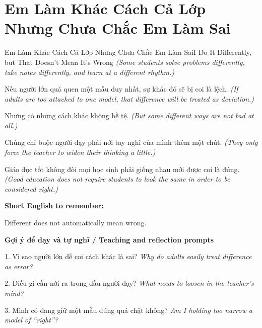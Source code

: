 \section{Em Làm Khác Cách Cả Lớp Nhưng Chưa Chắc Em Làm Sai}
\begin{truyen}{Em Làm Khác Cách Cả Lớp Nhưng Chưa Chắc Em Làm Sai}{I Do It Differently, but That Doesn't Mean It's Wrong}
\textit{(Some students solve problems differently, take notes differently, and learn at a different rhythm.)}

Nếu người lớn quá quen một mẫu duy nhất, sự khác đó sẽ bị coi là lệch.
\textit{(If adults are too attached to one model, that difference will be treated as deviation.)}

Nhưng có những cách khác không hề tệ.
\textit{(But some different ways are not bad at all.)}

Chúng chỉ buộc người dạy phải nới tay nghĩ của mình thêm một chút.
\textit{(They only force the teacher to widen their thinking a little.)}

\end{truyen}

\begin{baihoc}
Giáo dục tốt không đòi mọi học sinh phải giống nhau mới được coi là đúng.
\textit{(Good education does not require students to look the same in order to be considered right.)}
\end{baihoc}

\begin{ghinhoanh}
\textbf{Short English to remember:}

Different does not automatically mean wrong.

\end{ghinhoanh}

\begin{tuhocnhanh}
\textbf{Gợi ý để dạy và tự nghĩ / Teaching and reflection prompts}

1. Vì sao người lớn dễ coi cách khác là sai? \textit{Why do adults easily treat difference as error?}

2. Điều gì cần nới ra trong đầu người dạy? \textit{What needs to loosen in the teacher's mind?}

3. Mình có đang giữ một mẫu đúng quá chật không? \textit{Am I holding too narrow a model of “right”?}
\end{tuhocnhanh}
\ngancach


